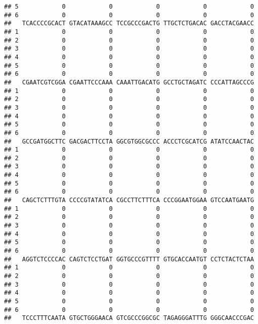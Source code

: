 \documentclass[]{article}
\begin{document}
\begin{verbatim}
## 5            0            0            0            0            0
## 6            0            0            0            0            0
##   TCACCCCGCACT GTACATAAAGCC TCCGCCCGACTG TTGCTCTGACAC GACCTACGAACC
## 1            0            0            0            0            0
## 2            0            0            0            0            0
## 3            0            0            0            0            0
## 4            0            0            0            0            0
## 5            0            0            0            0            0
## 6            0            0            0            0            0
##   CGAATCGTCGGA CGAATTCCCAAA CAAATTGACATG GCCTGCTAGATC CCCATTAGCCCG
## 1            0            0            0            0            0
## 2            0            0            0            0            0
## 3            0            0            0            0            0
## 4            0            0            0            0            0
## 5            0            0            0            0            0
## 6            0            0            0            0            0
##   GCCGATGGCTTC GACGACTTCCTA GGCGTGGCGCCC ACCCTCGCATCG ATATCCAACTAC
## 1            0            0            0            0            0
## 2            0            0            0            0            0
## 3            0            0            0            0            0
## 4            0            0            0            0            0
## 5            0            0            0            0            0
## 6            0            0            0            0            0
##   CAGCTCTTTGTA CCCCGTATATCA CGCCTTCTTTCA CCCGGAATGGAA GTCCAATGAATG
## 1            0            0            0            0            0
## 2            0            0            0            0            0
## 3            0            0            0            0            0
## 4            0            0            0            0            0
## 5            0            0            0            0            0
## 6            0            0            0            0            0
##   AGGTCTCCCCAC CAGTCTCCTGAT GGTGCCCGTTTT GTGCACCAATGT CCTCTACTCTAA
## 1            0            0            0            0            0
## 2            0            0            0            0            0
## 3            0            0            0            0            0
## 4            0            0            0            0            0
## 5            0            0            0            0            0
## 6            0            0            0            0            0
##   TCCCTTTCAATA GTGCTGGGAACA GTCGCCCGGCGC TAGAGGGATTTG GGGCAACCCGAC

\end{verbatim}
\end{document}
